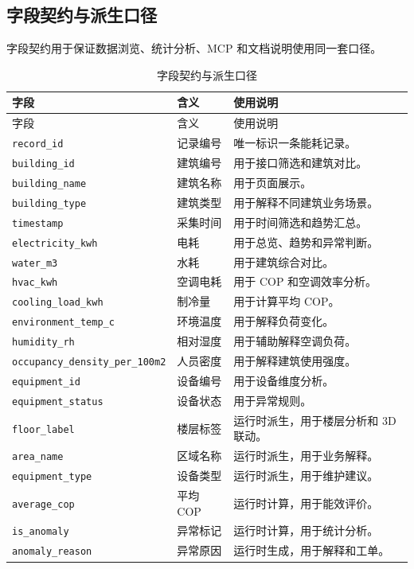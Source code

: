 \documentclass[12pt,a4paper]{ctexart}
\newcommand{\code}[1]{{\footnotesize\nolinkurl{#1}}}
\begin{document}
\subsection{字段契约与派生口径}
字段契约用于保证数据浏览、统计分析、MCP 和文档说明使用同一套口径。
\begin{longtable}{L{4.2cm}L{3.0cm}L{7.4cm}}
\caption{字段契约与派生口径}\\
\toprule
字段 & 含义 & 使用说明 \\
\midrule
\endfirsthead
\toprule
字段 & 含义 & 使用说明 \\
\midrule
\endhead
\code{record_id} & 记录编号 & 唯一标识一条能耗记录。 \\
\code{building_id} & 建筑编号 & 用于接口筛选和建筑对比。 \\
\code{building_name} & 建筑名称 & 用于页面展示。 \\
\code{building_type} & 建筑类型 & 用于解释不同建筑业务场景。 \\
\code{timestamp} & 采集时间 & 用于时间筛选和趋势汇总。 \\
\code{electricity_kwh} & 电耗 & 用于总览、趋势和异常判断。 \\
\code{water_m3} & 水耗 & 用于建筑综合对比。 \\
\code{hvac_kwh} & 空调电耗 & 用于 COP 和空调效率分析。 \\
\code{cooling_load_kwh} & 制冷量 & 用于计算平均 COP。 \\
\code{environment_temp_c} & 环境温度 & 用于解释负荷变化。 \\
\code{humidity_rh} & 相对湿度 & 用于辅助解释空调负荷。 \\
\code{occupancy_density_per_100m2} & 人员密度 & 用于解释建筑使用强度。 \\
\code{equipment_id} & 设备编号 & 用于设备维度分析。 \\
\code{equipment_status} & 设备状态 & 用于异常规则。 \\
\code{floor_label} & 楼层标签 & 运行时派生，用于楼层分析和 3D 联动。 \\
\code{area_name} & 区域名称 & 运行时派生，用于业务解释。 \\
\code{equipment_type} & 设备类型 & 运行时派生，用于维护建议。 \\
\code{average_cop} & 平均 COP & 运行时计算，用于能效评价。 \\
\code{is_anomaly} & 异常标记 & 运行时计算，用于统计分析。 \\
\code{anomaly_reason} & 异常原因 & 运行时生成，用于解释和工单。 \\
\bottomrule
\end{longtable}
\end{document}
